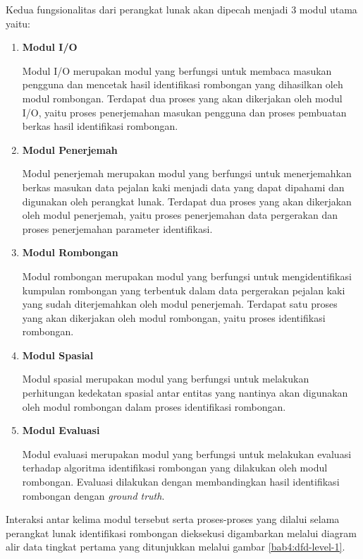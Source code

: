 \noindent Kedua fungsionalitas dari perangkat lunak akan dipecah menjadi 3 modul utama yaitu:

\begin{enumerate}
    \item \textbf{Modul I/O}
    
    Modul I/O merupakan modul yang berfungsi untuk membaca masukan pengguna dan mencetak hasil identifikasi rombongan yang dihasilkan oleh modul rombongan. Terdapat dua proses yang akan dikerjakan oleh modul I/O, yaitu proses penerjemahan masukan pengguna dan proses pembuatan berkas hasil identifikasi rombongan.
    
    \item \textbf{Modul Penerjemah}
    
    Modul penerjemah merupakan modul yang berfungsi untuk menerjemahkan berkas masukan data pejalan kaki menjadi data yang dapat dipahami dan digunakan oleh perangkat lunak. Terdapat dua proses yang akan dikerjakan oleh modul penerjemah, yaitu proses penerjemahan data pergerakan dan proses penerjemahan parameter identifikasi.
    
    \item \textbf{Modul Rombongan}
    
    Modul rombongan merupakan modul yang berfungsi untuk mengidentifikasi kumpulan rombongan yang terbentuk dalam data pergerakan pejalan kaki yang sudah diterjemahkan oleh modul penerjemah. Terdapat satu proses yang akan dikerjakan oleh modul rombongan, yaitu proses identifikasi rombongan.
    
    \item \textbf{Modul Spasial}
    
    Modul spasial merupakan modul yang berfungsi untuk melakukan perhitungan kedekatan spasial antar entitas yang nantinya akan digunakan oleh modul rombongan dalam proses identifikasi rombongan.
    
    \item \textbf{Modul Evaluasi}
    
    Modul evaluasi merupakan modul yang berfungsi untuk melakukan evaluasi terhadap algoritma identifikasi rombongan yang dilakukan oleh modul rombongan. Evaluasi dilakukan dengan membandingkan hasil identifikasi rombongan dengan \textit{ground truth}.
\end{enumerate}

Interaksi antar kelima modul tersebut serta proses-proses yang dilalui selama perangkat lunak identifikasi rombongan dieksekusi digambarkan melalui diagram alir data tingkat pertama yang ditunjukkan melalui gambar \ref{bab4:dfd-level-1}.

